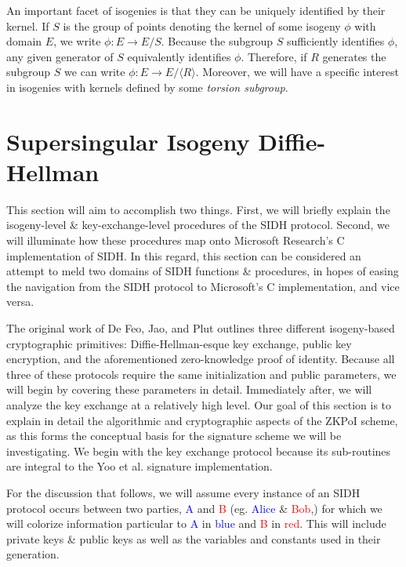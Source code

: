 An important facet of isogenies is that they can be uniquely identified by their kernel. If $S$ is the group of points denoting the kernel of some isogeny $\phi$ with domain $E$, we write $\phi: E \rightarrow E/S$. Because the subgroup $S$ sufficiently identifies $\phi$, any given generator of $S$ equivalently identifies $\phi$. Therefore, if $R$ generates the subgroup $S$ we can write $\phi: E \rightarrow E/\langle R \rangle$. Moreover, we will have a specific interest in isogenies with kernels defined by some \emph{torsion subgroup}. 

\section{Supersingular Isogeny Diffie-Hellman}

This section will aim to accomplish two things. First, we will briefly explain the isogeny-level \& key-exchange-level procedures of the SIDH protocol. Second, we will illuminate how these procedures map onto Microsoft Research's C implementation of SIDH. In this regard, this section can be considered an attempt to meld two domains of SIDH functions \& procedures, in hopes of easing the navigation from the SIDH protocol to Microsoft's C implementation, and vice versa.

The original work of De Feo, Jao, and Plut outlines three different isogeny-based cryptographic primitives: Diffie-Hellman-esque key exchange, public key encryption, and the aforementioned zero-knowledge proof of identity. Because all three of these protocols require the same initialization and public parameters, we will begin by covering these parameters in detail. Immediately after, we will analyze the key exchange at a relatively high level. Our goal of this section is to explain in detail the algorithmic and cryptographic aspects of the ZKPoI scheme, as this forms the conceptual basis for the signature scheme we will be investigating. We begin with the key exchange protocol because its sub-routines are integral to the Yoo et al. signature implementation.

For the discussion that follows, we will assume every instance of an SIDH protocol occurs between two parties, \textcolor{blue}{A} and \textcolor{red}{B} (eg. \textcolor{blue}{Alice} \& \textcolor{red}{Bob},) for which we will colorize information particular to \textcolor{blue}{A} in \textcolor{blue}{blue} and \textcolor{red}{B} in \textcolor{red}{red}. This will include private keys \& public keys as well as the variables and constants used in their generation.\\

